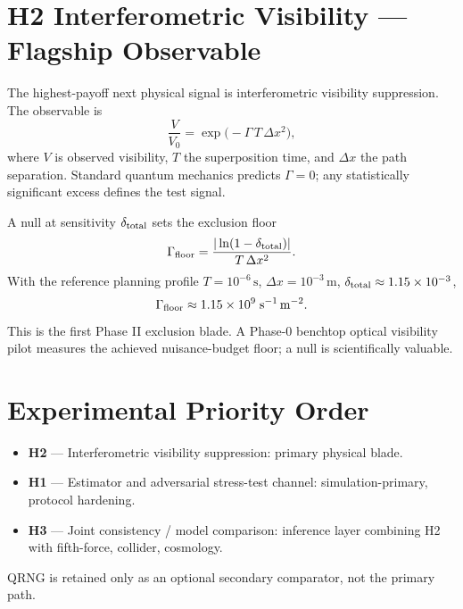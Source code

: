 \documentclass[reprint,amsmath,amssymb,aps,showkeys]{revtex4-2}
\begin{document}
\section{H2 Interferometric Visibility --- Flagship Observable}
The highest-payoff next physical signal is interferometric visibility suppression. The observable is
\begin{equation}
\frac{V}{V_0}=\exp\!\Big(-\Gamma\,T\,\Delta x^2\Big),
\label{eq:visibility}
\end{equation}
where $V$ is observed visibility, $T$ the superposition time, and $\Delta x$ the path separation. Standard quantum mechanics predicts $\Gamma=0$; any statistically significant excess defines the test signal.

A null at sensitivity $\delta_{\rm total}$ sets the exclusion floor
\begin{equation}
\Gamma_{\rm floor}=\frac{|\ln(1-\delta_{\rm total})|}{T\,\Delta x^2}.
\label{eq:Gamma_floor}
\end{equation}
With the reference planning profile $T=10^{-6}\,\mathrm{s}$, $\Delta x=10^{-3}\,\mathrm{m}$, $\delta_{\rm total}\approx 1.15\times 10^{-3}$,
\[
\Gamma_{\rm floor}\approx 1.15\times 10^9\;\mathrm{s}^{-1}\,\mathrm{m}^{-2}.
\]
This is the first Phase II exclusion blade. A Phase-0 benchtop optical visibility pilot measures the achieved nuisance-budget floor; a null is scientifically valuable.

\section{Experimental Priority Order}
\begin{itemize}[leftmargin=*]
\item \textbf{H2} --- Interferometric visibility suppression: primary physical blade.
\item \textbf{H1} --- Estimator and adversarial stress-test channel: simulation-primary, protocol hardening.
\item \textbf{H3} --- Joint consistency / model comparison: inference layer combining H2 with fifth-force, collider, cosmology.
\end{itemize}
QRNG is retained only as an optional secondary comparator, not the primary path.
\end{document}
